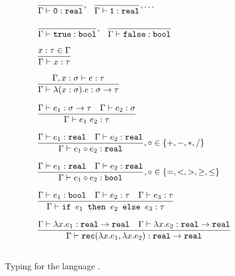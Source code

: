 \begin{figure}
\[
\begin{array}{lr}
\dfrac{}{\Gamma \vdash \texttt{0}: \texttt{real}}, \ \ \dfrac{}{\Gamma \vdash \texttt{1}: \texttt{real}}, \ldots \\ \\
\dfrac{}{\Gamma \vdash \texttt{true} : \texttt{bool}}, \ \ \dfrac{}{\Gamma \vdash \texttt{false} : \texttt{bool}} \\  \\
\dfrac{x : \tau \in \Gamma}{\Gamma \vdash x : \tau } \\ \\ 
\dfrac{\Gamma, x : \sigma \vdash e : \tau}{\Gamma \vdash \lambda (x : \sigma).e : \sigma \rightarrow \tau } \\ \\
\dfrac{\Gamma \vdash e_1: \sigma \rightarrow \tau \ \ \ \Gamma \vdash e_2 : \sigma}{\Gamma \vdash e_1 \ e_2 : \tau} \\ \\
\dfrac{\Gamma \vdash e_1 : \texttt{real} \ \ \ \Gamma \vdash e_2 : \texttt{real}}{\Gamma \vdash e_1 \circ e_2 : \texttt{real}}
, \circ \in \{+,-,*,/\} \\ \\ 
\dfrac{\Gamma \vdash e_1 : \texttt{real} \ \ \ \Gamma \vdash e_2 : \texttt{real}}{\Gamma \vdash e_1 \circ e_2 : \texttt{bool}}
, \circ \in \{=, <, >, \geq, \leq\} \\ \\ 
\dfrac{\Gamma \vdash e_1 : \texttt{bool} \ \ \ \Gamma \vdash e_2 : \tau \ \ \ \Gamma \vdash e_3 : \tau}
{\Gamma \vdash \ifelse{e_1}{e_2}{e_3} : \tau} \\ \\ 
\dfrac{\Gamma \vdash \lambda x.e_1 : \texttt{real} \rightarrow \texttt{real} \ \ \ \Gamma \vdash \lambda x.e_2 : 
\texttt{real} \rightarrow \texttt{real}}
{\Gamma \vdash \texttt{rec}(\lambda x.e_1, \lambda x.e_2) : \texttt{real} \rightarrow \texttt{real}} \\ \\ 
\end{array}
\]
\caption{Typing for the language .}
\label{fig:typing}
\end{figure}

